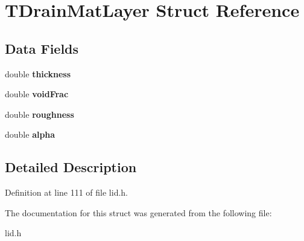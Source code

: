 \hypertarget{struct_t_drain_mat_layer}{}\section{T\+Drain\+Mat\+Layer Struct Reference}
\label{struct_t_drain_mat_layer}
\subsection*{Data Fields}
\begin{DoxyCompactItemize}
\item 
\mbox{\label{struct_t_drain_mat_layer_a20238819f2c84ce6d3f083ded9ac612d}} 
double {\bfseries thickness}
\item 
\mbox{\label{struct_t_drain_mat_layer_a7d25974d9e4546293ba18fee0f29620f}} 
double {\bfseries void\+Frac}
\item 
\mbox{\label{struct_t_drain_mat_layer_aae6a29bf1aea8336238154d7b4b95994}} 
double {\bfseries roughness}
\item 
\mbox{\label{struct_t_drain_mat_layer_a20f4c4490bc8ecbdd1ffcb79acce6035}} 
double {\bfseries alpha}
\end{DoxyCompactItemize}


\subsection{Detailed Description}


Definition at line 111 of file lid.\+h.



The documentation for this struct was generated from the following file\+:\begin{DoxyCompactItemize}
\item 
lid.\+h\end{DoxyCompactItemize}
